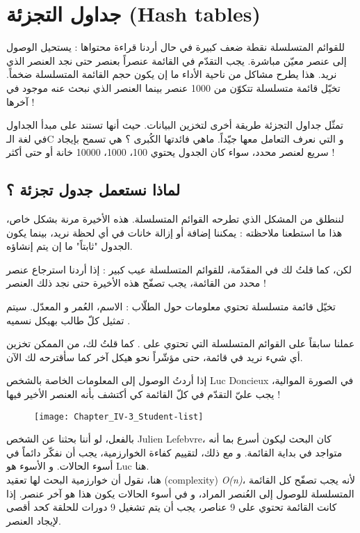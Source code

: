 \chapter{جداول التجزئة (\textenglish{Hash tables})}

للقوائم المتسلسلة نقطة ضعف كبيرة في حال أردنا قراءة محتواها : يستحيل الوصول إلى عنصر معيّن مباشرة. يجب التقدّم في القائمة عنصراً بعنصر حتى نجد العنصر الذي نريد. هذا يطرح مشاكل من ناحية الأداء ما إن يكون حجم القائمة المتسلسلة ضخماً. تخيّل قائمة متسلسلة تتكوّن من 1000 عنصر بينما العنصر الذي نبحث عنه موجود في آخرها !

تمثّل جداول التجزئة طريقة أخرى لتخزين البيانات. حيث أنها تستند على مبدأ الجداول في لغة الـ\textenglish{C}
و التي نعرف التعامل معها جيّداً. ماهي فائدتها الكُبرى ؟ هي تسمح بإيجاد سريع لعنصر محدد، سواء كان الجدول يحتوي 100، 1000، 10000 خانة أو حتى أكثر !

\section{لماذا نستعمل جدول تجزئة ؟}

لننطلق من المشكل الذي تطرحه القوائم المتسلسلة. هذه الأخيرة مرنة بشكل خاص، هذا ما استطعنا ملاحظته : يمكننا إضافة أو إزالة خانات في أي لحظة نريد، بينما يكون الجدول "ثابتاً" ما إن يتم إنشاؤه.

لكن، كما قلتُ لك في المقدّمة، للقوائم المتسلسلة عيب كبير : إذا أردنا استرجاع عنصر محدد من القائمة، يجب تصفّح هذه الأخيرة حتى نجد ذلك العنصر !

تخيّل قائمة متسلسلة تحتوي معلومات حول الطلّاب : الاسم، العُمر و المعدّل. سيتم تمثيل كلّ طالب بهيكل نسميه
.

\begin{information}
عملنا سابقاً على القوائم المتسلسلة التي تحتوي على
.
 كما قلتُ لك، من الممكن تخزين أي شيء نريد في قائمة، حتى مؤشّراً نحو هيكل آخر كما سأقترحه لك الآن.
\end{information}

 إذا أردتُ الوصول إلى المعلومات الخاصة بالشخص
\textenglish{Luc Doncieux}
 في الصورة الموالية، يجب عليّ التقدّم في كلّ القائمة كي أكتشف بأنه العنصر الأخير فيها !
 
\begin{figure}[H]
	\centering
	\texttt{[image: Chapter\_IV-3\_Student-list]}
\end{figure}

\begin{information}
بالفعل، لو أننا بحثنا عن الشخص 
\textenglish{Julien Lefebvre}،
كان البحث ليكون أسرع بما أنه متواجد في بداية القائمة. و مع ذلك، لتقييم كفاءة الخوارزمية، يجب أن نفكّر دائماً في أسوء الحالات. و الأسوء هو
\textenglish{Luc}
هنا.\\
هنا، نقول أن خوارزمية البحث لها تعقيد
(\textenglish{complexity})
\textit{\textenglish{O(n)}}،
لأنه يجب تصفّح كل القائمة المتسلسلة للوصول إلى العُنصر المراد، و في أسوء الحالات يكون هذا هو آخر عنصر. إذا كانت القائمة تحتوي على 9 عناصر، يجب أن يتم تشغيل 9 دورات للحلقة كحد أقصى لإيجاد العنصر.
\end{information}

